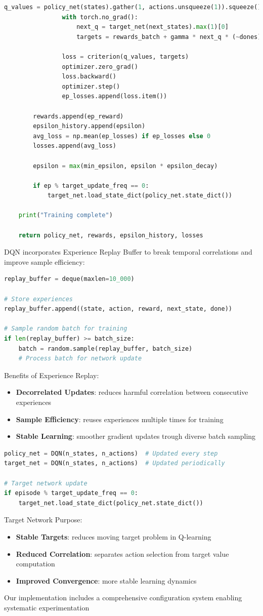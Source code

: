 \documentclass[a4paper,12pt]{article}
\begin{document}
\begin{lstlisting}[language=Python]
                q_values = policy_net(states).gather(1, actions.unsqueeze(1)).squeeze()
                with torch.no_grad():
                    next_q = target_net(next_states).max(1)[0]
                    targets = rewards_batch + gamma * next_q * (~dones)

                loss = criterion(q_values, targets)
                optimizer.zero_grad()
                loss.backward()
                optimizer.step()
                ep_losses.append(loss.item())

        rewards.append(ep_reward)
        epsilon_history.append(epsilon)
        avg_loss = np.mean(ep_losses) if ep_losses else 0
        losses.append(avg_loss)

        epsilon = max(min_epsilon, epsilon * epsilon_decay)

        if ep % target_update_freq == 0:
            target_net.load_state_dict(policy_net.state_dict())

    print("Training complete")

    return policy_net, rewards, epsilon_history, losses
\end{lstlisting}
DQN incorporates Experience Replay Buffer to break temporal correlations and improve sample efficiency:
\begin{lstlisting}[language=Python]
replay_buffer = deque(maxlen=10_000)

# Store experiences
replay_buffer.append((state, action, reward, next_state, done))

# Sample random batch for training
if len(replay_buffer) >= batch_size:
    batch = random.sample(replay_buffer, batch_size)
    # Process batch for network update
\end{lstlisting}
Benefits of Experience Replay:
\begin{itemize}
    \item \textbf{Decorrelated Updates}: reduces harmful correlation between consecutive experiences 
    \item \textbf{Sample Efficiency}: reuses experiences multiple times for training
    \item \textbf{Stable Learning}: smoother gradient updates trough diverse batch sampling
\end{itemize}
\begin{lstlisting}[language=Python]
policy_net = DQN(n_states, n_actions)  # Updated every step
target_net = DQN(n_states, n_actions)  # Updated periodically

# Target network update
if episode % target_update_freq == 0:
    target_net.load_state_dict(policy_net.state_dict())
\end{lstlisting}
Target Network Purpose:
\begin{itemize}
    \item \textbf{Stable Targets}: reduces moving target problem in Q-learning
    \item \textbf{Reduced Correlation}: separates action selection from target value computation
    \item \textbf{Improved Convergence}: more stable learning dynamics
\end{itemize}
Our implementation includes a comprehensive configuration system enabling systematic experimentation
\end{document}
